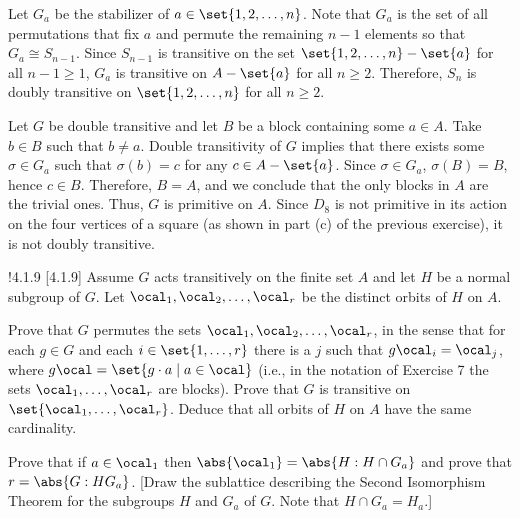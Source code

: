 \begin{solenum}
	\item Let $G_a$ be the stabilizer of $a \in \set{1, 2, \ldots, n}$.
	Note that $G_a$ is the set of all permutations that fix $a$ and permute the remaining $n - 1$ elements so that $G_a \cong S_{n - 1}$.
	Since $S_{n - 1}$ is transitive on the set $\set{1, 2, \ldots, n} - \set{a}$ for all $n - 1 \geq 1$, $G_a$ is transitive on $A - \set{a}$ for all $n \geq 2$.
	Therefore, $S_n$ is doubly transitive on $\set{1, 2, \ldots, n}$ for all $n \geq 2$.
	\item Let $G$ be double transitive and let $B$ be a block containing some $a \in A$.
	Take $b \in B$ such that $b \neq a$.
	Double transitivity of $G$ implies that there exists some $\sigma \in G_a$ such that $\sigma(b) = c$ for any $c \in A - \set{a}$.
	Since $\sigma \in G_a$, $\sigma(B) = B$, hence $c \in B$.
	Therefore, $B = A$, and we conclude that the only blocks in $A$ are the trivial ones.
	Thus, $G$ is primitive on $A$.
	Since $D_8$ is not primitive in its action on the four vertices of a square (as shown in part (c) of the previous exercise), it is not doubly transitive.
\end{solenum}

\begin{exercise}!{4.1.9}
	[4.1.9] Assume $G$ acts transitively on the finite set $A$ and let $H$ be a normal subgroup of $G$.
	Let $\ocal_1, \ocal_2, \ldots, \ocal_r$ be the distinct orbits of $H$ on $A$.
	\begin{subexercises}
		\item Prove that $G$ permutes the sets $\ocal_1, \ocal_2, \ldots, \ocal_r$, in the sense that for each $g \in G$ and each $i \in \set{1,\ldots,r}$ there is a $j$ such that $g \ocal_i = \ocal_j$, where $g\ocal = \set{g \cdot a \mid a \in \ocal}$ (i.e., in the notation of Exercise 7 the sets $\ocal_1, \ldots, \ocal_r$ are blocks).
		Prove that $G$ is transitive on $\set{\ocal_1, \ldots, \ocal_r}$.
		Deduce that all orbits of $H$ on $A$ have the same cardinality.
		\item Prove that if $a \in \ocal_1$ then $\abs{\ocal_1} = \abs{H : H \cap G_a}$ and prove that $r = \abs{G : HG_a}$. [Draw the sublattice describing the Second Isomorphism Theorem for the subgroups $H$ and $G_a$ of $G$.
		Note that $H \cap G_a = H_a$.]
	\end{subexercises}
\end{exercise}

